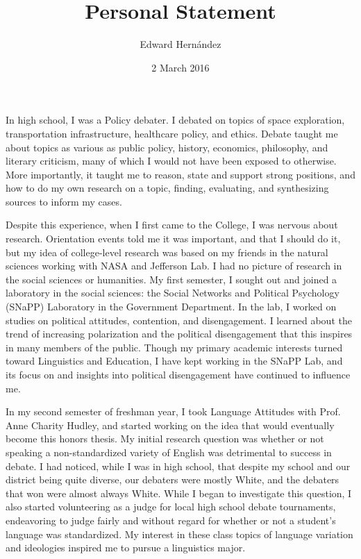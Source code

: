 \documentclass[doc,12pt,natbib]{apa6}
\begin{document}
\title{Personal Statement}
\author{Edward Hern\'{a}ndez}
\date{2 March 2016}

In high school, I was a Policy debater. I debated on topics of space
exploration, transportation infrastructure, healthcare policy, and ethics.
Debate taught me about topics as various as public policy, history, economics,
philosophy, and literary criticism, many of which I would not have been exposed
to otherwise. More importantly, it taught me to reason, state and support
strong positions, and how to do my own research on a topic, finding,
evaluating, and synthesizing sources to inform my cases.

Despite this experience, when I first came to the College, I was nervous about
research. Orientation events told me it was important, and that I should do it,
but my idea of college-level research was based on my friends in the natural
sciences working with NASA and Jefferson Lab. I had no picture of research in
the social sciences or humanities. My first semester, I sought out and joined a
laboratory in the social sciences: the Social Networks and Political Psychology
(SNaPP) Laboratory in the Government Department. In the lab, I worked on
studies on political attitudes, contention, and disengagement. I learned about
the trend of increasing polarization and the political disengagement that this
inspires in many members of the public. Though my primary academic interests
turned toward Linguistics and Education, I have kept working in the SNaPP Lab,
and its focus on and insights into political disengagement have continued to
influence me. 

In my second semester of freshman year, I took Language Attitudes with Prof.
Anne Charity Hudley, and started working on the idea that would eventually
become this honors thesis. My initial research question was whether or not
speaking a non-standardized variety of English was detrimental to success in
debate. I had noticed, while I was in high school, that despite my school and
our district being quite diverse, our debaters were mostly White, and the
debaters that won were almost always White. While I began to investigate this
question, I also started volunteering as a judge for local high school debate
tournaments, endeavoring to judge fairly and without regard for whether or not
a student's language was standardized. My interest in these class topics of
language variation and ideologies inspired me to pursue a linguistics major.
\end{document}

